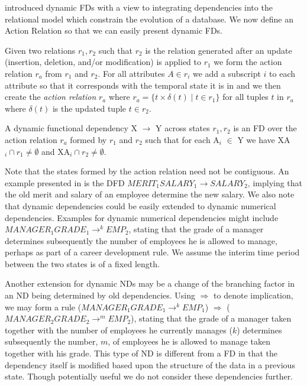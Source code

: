 \cite{Via87,Via88} introduced dynamic FDs with a view to integrating
dependencies into the relational model which constrain the evolution of
a database. We
now define an Action Relation so that we can easily present dynamic FDs.
\begin{definition}
\begin{rm}
Given two relations $r_1, r_2$ such that $r_2$ is the relation
generated after an update (insertion, deletion, and/or modification) 
is applied to $r_1$ we form the action relation $r_a$ from $r_1$ and $r_2$.
 For all attributes $A \in r_i$ we add a subscript
$i$ to each attribute so that it corresponds with the temporal state
it is in and we then create the {\em action relation} $r_a$ where
$r_a = \{ t \times \delta(t) \mid t \in r_1 \}$ for all tuples $t$ in
$r_a$ where 
$\delta (t) $ is the updated tuple $t \in r_2$. 
\end{rm}
\end{definition}
\begin{definition}
\begin{rm}
A dynamic functional dependency X $\to$ Y across states $r_1, r_2$
is an FD over the action relation $r_a$ formed by $r_1$ and $r_2$ such
that for each A$_i$ $\in$ Y we have XA$_i \cap r_1 \not= \emptyset$ and 
XA$_i \cap r_2 \not= \emptyset$.
\end{rm}
\end{definition}

Note that the states formed by the action relation need not be contiguous.
An example presented in \cite{Via87} is the DFD $MERIT_1 SALARY_1 \to
SALARY_2$, implying that the old merit and salary of an employee determine the 
new salary. We also note that dynamic dependencies could be easily
extended to dynamic numerical dependencies.  Examples for dynamic
numerical dependencies might include $MANAGER_1 GRADE_1 \to^k EMP_2$, stating that the grade of a manager determines subsequently the number
of employees he is allowed to manage, perhaps as part of a career
development rule.  We assume the
interim time period between the two states is of a fixed length.

\medskip

Another extension for dynamic NDs may be a change of the branching
factor in an ND being determined by old dependencies. Using
$\Rightarrow$ to denote implication, we may form a rule
($MANAGER_1 GRADE_1 \to^k EMP_1$) $\Rightarrow$  ($MANAGER_2 GRADE_2 \to^m EMP_2$),
stating that the grade of a manager taken together with the number of employees
he currently manages ($k$) determines subsequently the number, $m$, of 
employees he is allowed to manage taken together with his grade. 
This type of ND is 
different from a FD in that the dependency itself is
modified based upon the structure of the data in a previous
state. Though potentially useful we
do not consider these dependencies further.

